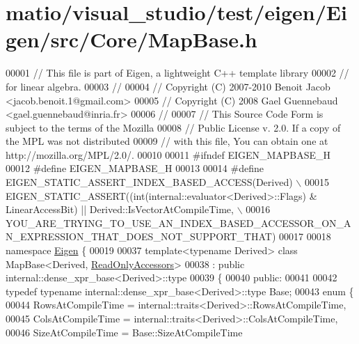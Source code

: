 \hypertarget{matio_2visual__studio_2test_2eigen_2_eigen_2src_2_core_2_map_base_8h_source}{}\section{matio/visual\+\_\+studio/test/eigen/\+Eigen/src/\+Core/\+Map\+Base.h}
\label{matio_2visual__studio_2test_2eigen_2_eigen_2src_2_core_2_map_base_8h_source}

\begin{DoxyCode}
00001 \textcolor{comment}{// This file is part of Eigen, a lightweight C++ template library}
00002 \textcolor{comment}{// for linear algebra.}
00003 \textcolor{comment}{//}
00004 \textcolor{comment}{// Copyright (C) 2007-2010 Benoit Jacob <jacob.benoit.1@gmail.com>}
00005 \textcolor{comment}{// Copyright (C) 2008 Gael Guennebaud <gael.guennebaud@inria.fr>}
00006 \textcolor{comment}{//}
00007 \textcolor{comment}{// This Source Code Form is subject to the terms of the Mozilla}
00008 \textcolor{comment}{// Public License v. 2.0. If a copy of the MPL was not distributed}
00009 \textcolor{comment}{// with this file, You can obtain one at http://mozilla.org/MPL/2.0/.}
00010 
00011 \textcolor{preprocessor}{#ifndef EIGEN\_MAPBASE\_H}
00012 \textcolor{preprocessor}{#define EIGEN\_MAPBASE\_H}
00013 
00014 \textcolor{preprocessor}{#define EIGEN\_STATIC\_ASSERT\_INDEX\_BASED\_ACCESS(Derived) \(\backslash\)}
00015 \textcolor{preprocessor}{      EIGEN\_STATIC\_ASSERT((int(internal::evaluator<Derived>::Flags) & LinearAccessBit) ||
       Derived::IsVectorAtCompileTime, \(\backslash\)}
00016 \textcolor{preprocessor}{                         
       YOU\_ARE\_TRYING\_TO\_USE\_AN\_INDEX\_BASED\_ACCESSOR\_ON\_AN\_EXPRESSION\_THAT\_DOES\_NOT\_SUPPORT\_THAT)}
00017 
00018 \textcolor{keyword}{namespace }\hyperlink{namespace_eigen}{Eigen} \{ 
00019 
00037 \textcolor{keyword}{template}<\textcolor{keyword}{typename} Derived> \textcolor{keyword}{class }MapBase<Derived, \hyperlink{group__enums_gga9f93eac38eb83deb0e8dbd42ddf11d5da42865f87356ad7e585a1bfbfd1b81699}{ReadOnlyAccessors}>
00038   : \textcolor{keyword}{public} internal::dense\_xpr\_base<Derived>::type
00039 \{
00040   \textcolor{keyword}{public}:
00041 
00042     \textcolor{keyword}{typedef} \textcolor{keyword}{typename} internal::dense\_xpr\_base<Derived>::type Base;
00043     \textcolor{keyword}{enum} \{
00044       RowsAtCompileTime = internal::traits<Derived>::RowsAtCompileTime,
00045       ColsAtCompileTime = internal::traits<Derived>::ColsAtCompileTime,
00046       SizeAtCompileTime = Base::SizeAtCompileTime

\end{DoxyCode}
